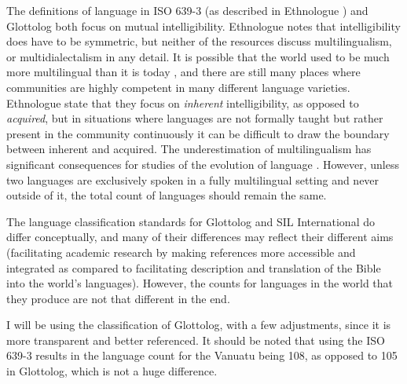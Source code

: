 \documentclass[unnumsec,webpdf,modern,medium]{oup-authoring-template}
\begin{document}
\begin{appendices}
The definitions of language in ISO 639-3 (as described in Ethnologue \citep{ethnologue2019lgident}) and Glottolog both focus on mutual intelligibility. Ethnologue notes that intelligibility does have to be symmetric, but neither of the resources discuss multilingualism, or multidialectalism in any detail. It is possible that the world used to be much more multilingual than it is today \citep{evans2017did}, and there are still many places where communities are highly competent in many different language varieties. Ethnologue state that they focus on \emph{inherent} intelligibility, as opposed to \emph{acquired}, but in situations where languages are not formally taught but rather present in the community continuously it can be difficult to draw the boundary between inherent and acquired. The underestimation of multilingualism has significant consequences for studies of the evolution of language \citep{roberts2013evolutionary}. However, unless two languages are exclusively spoken in a fully multilingual setting and never outside of it, the total count of languages should remain the same. 

The language classification standards for Glottolog and SIL International do differ conceptually, and many of their differences may reflect their different aims (facilitating academic research by making references more accessible and integrated as compared to facilitating description and translation of the Bible into the world's languages). However, the counts for languages in the world that they produce are not that different in the end.

I will be using the classification of Glottolog, with a few adjustments, since it is more transparent and better referenced. It should be noted that using the ISO 639-3 results in the language count for the Vanuatu being 108, as opposed to 105 in Glottolog, which is not a huge difference. 


\end{appendices}
\end{document}
